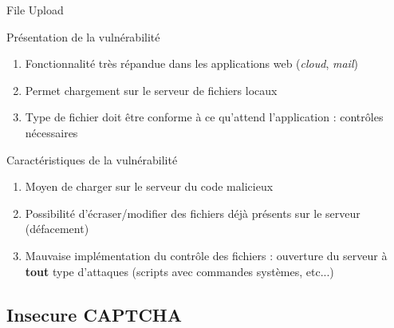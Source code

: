 \documentclass[8pt]{beamer}
\begin{document}
\begin{frame}{File Upload}


\begin{block}{Présentation de la vulnérabilité}
	\begin{enumerate}[\ding{217}]
		\item Fonctionnalité très répandue dans les applications web (\textit{cloud}, \textit{mail})
		\item Permet chargement sur le serveur de fichiers locaux
		\item Type de fichier doit être conforme à ce qu'attend l'application : contrôles nécessaires
	\end{enumerate}
\end{block}


\begin{block}{Caractéristiques de la vulnérabilité}
	\begin{enumerate}[\ding{217}]
		\item Moyen de charger sur le serveur du code malicieux
		\item Possibilité d'écraser/modifier des fichiers déjà présents sur le serveur (défacement)
		\item Mauvaise implémentation du contrôle des fichiers : ouverture du serveur à \textbf{tout} type d'attaques (scripts avec commandes systèmes, etc...)
	\end{enumerate}
\end{block}

\end{frame}

\subsection{Insecure CAPTCHA}
\end{document}
